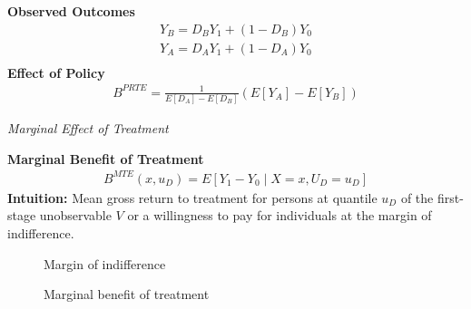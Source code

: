 \begin{frame}
	\textbf{Observed Outcomes}
	\begin{align*}
		Y_B = D_B Y_1 + (1 - D_B) Y_0 \\
		Y_A = D_A Y_1 + (1 - D_A) Y_0 \\
	\end{align*}
	\textbf{Effect of Policy}
	\begin{align*}
		B^{PRTE} = \frac{1}{E[D_A] - E[D_B]} (E[Y_A] - E[Y_B])
	\end{align*}
\end{frame}
\begin{frame}\begin{center}
		\LARGE\textit{Marginal Effect of Treatment}
\end{center}\end{frame}
\begin{frame}\textbf{Marginal Benefit of Treatment}
	\begin{align*}
		B^{MTE}(x, u_D) = E [Y_1 - Y_0 \mid X = x,  U_D = u_D]
	\end{align*}
	\textbf{Intuition:} Mean gross return to treatment for persons at
	quantile \(u_D\) of the first-stage unobservable \(V\) or a willingness to pay for individuals at the margin of indifference.
\end{frame}
\begin{frame}
	\begin{figure}\caption{Margin of indifference}
	\end{figure}
\end{frame}
\begin{frame}
	\begin{figure}\caption{Marginal benefit of treatment}
	\end{figure}
\end{frame}
